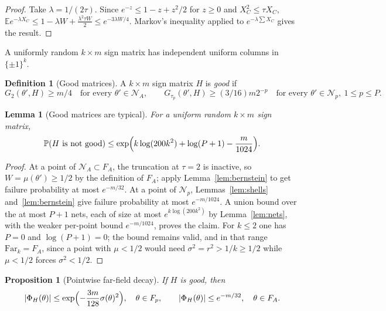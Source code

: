 \documentclass[11pt,reqno]{amsart}
\theoremstyle{plain}
\newtheorem{lemma}[theorem]{Lemma}
\newtheorem{proposition}[theorem]{Proposition}
\theoremstyle{definition}
\newtheorem{definition}[theorem]{Definition}
\theoremstyle{remark}
\begin{document}
\begin{proof}
Take \(\lambda=1/(2\tau)\). Since \(e^{-z}\le1-z+z^2/2\) for \(z\ge0\) and
\(X_C^2\le\tau X_C\),
\(\mathbb Ee^{-\lambda X_C}\le1-\lambda W+\tfrac{\lambda^2\tau W}2
\le e^{-3\lambda W/4}\). Markov's inequality applied to
\(e^{-\lambda\sum X_C}\) gives the result.
\end{proof}

A uniformly random \(k\times m\) sign matrix has independent uniform columns in
\(\{\pm1\}^k\).

\begin{definition}[Good matrices]\label{def:good}
A \(k\times m\) sign matrix \(H\) is \emph{good} if
\[
  G_2(\theta',H)\ge m/4\quad\text{for every }\theta'\in\mathcal N_A,\qquad
  G_{\tau_p}(\theta',H)\ge(3/16)m2^{-p}\quad\text{for every }
    \theta'\in\mathcal N_p,\ 1\le p\le P.
\]
\end{definition}

\begin{lemma}[Good matrices are typical]\label{lem:typical}
For a uniform random \(k\times m\) sign matrix,
\[
  \mathbb P(H\text{ is not good})\le
    \exp\Bigl(k\log(200k^2)+\log(P+1)-\frac m{1024}\Bigr).
\]
\end{lemma}

\begin{proof}
At a point of \(\mathcal N_A\subset F_A\), the truncation at \(\tau=2\) is
inactive, so \(W=\mu(\theta')\ge1/2\) by the definition of \(F_A\); apply
Lemma~\ref{lem:bernstein} to get failure probability at most \(e^{-m/32}\). At
a point of \(\mathcal N_p\), Lemmas~\ref{lem:shells} and~\ref{lem:bernstein}
give failure probability at most \(e^{-m/1024}\). A union bound over the at
most \(P+1\) nets, each of size at most \(e^{k\log(200k^2)}\) by
Lemma~\ref{lem:nets}, with the weaker per-point bound \(e^{-m/1024}\), proves
the claim. For \(k\le2\) one has \(P=0\) and \(\log(P+1)=0\); the bound remains
valid, and in that range \(\mathrm{Far}_k=F_A\), since a point with
\(\mu<1/2\) would need \(\sigma^2=r^2>1/k\ge1/2\) while \(\mu<1/2\) forces
\(\sigma^2<1/2\).
\end{proof}

\begin{proposition}[Pointwise far-field decay]\label{prop:pointwise}
If \(H\) is good, then
\[
  |\Phi_H(\theta)|\le\exp\Bigl(-\frac{3m}{128}\sigma(\theta)^2\Bigr),
    \quad\theta\in F_p,\qquad
  |\Phi_H(\theta)|\le e^{-m/32},\quad\theta\in F_A.
\]
\end{proposition}
\end{document}
